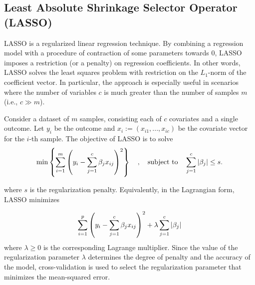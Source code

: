\subsection*{Least Absolute Shrinkage Selector Operator (LASSO)}

LASSO is a
regularized linear regression technique. By combining a regression
model with a procedure of contraction of some parameters towards $0$,
LASSO imposes a restriction (or a penalty) on
regression coefficients. In other words, LASSO solves the least
squares problem with restriction on the $ L_1$-norm of the coefficient
vector. In particular, the approach is especially useful in scenarios where the number
of variables $ c $ is much greater than the number of
samples $ m $ (i.e., $ c \gg m $).
\vspace{0.5cm}

Consider a dataset of $m$ samples, consisting each
of $c$ covariates and a single outcome. Let $y_i$ be the outcome and
$x_i := (x_{i1},...,x_{ic})$ be the covariate vector for the $i$-th
sample. The objective of LASSO is to solve
%
\begin{equation}
\min \left\lbrace\sum_{i=1}^{m}{\left( y_i-\sum_{j=1}^c{\beta_j
    x_{ij}}\right)^2} \right\rbrace \quad , \quad \textrm{subject to}
\quad \sum_{j=1}^c\abs{\beta_j}\leq s.
\end{equation}

where $s$ is the regularization penalty. 
Equivalently, in the Lagrangian form, LASSO minimizes

\begin{equation}
  \sum_{i=1}^{p}{\left( y_i-\sum_{j=1}^c{\beta_j x_{ij}}\right)^2} +
  \lambda \sum_{j=1}^c\abs{\beta_j}
\end{equation}
%
where $\lambda \geq 0$ is the
corresponding Lagrange multiplier. Since the value of the regularization
parameter $\lambda$
determines the degree of penalty and the accuracy of the model,
cross-validation is used to select the
regularization parameter that minimizes the
mean-squared error.
